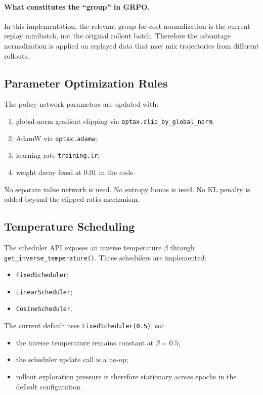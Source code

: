 \documentclass[11pt]{article}
\begin{document}
\paragraph{What constitutes the ``group'' in GRPO.}
In this implementation, the relevant group for cost normalization is the current replay minibatch, not the original rollout batch. Therefore the advantage normalization is applied on replayed data that may mix trajectories from different rollouts.

\subsection{Parameter Optimization Rules}

The policy-network parameters are updated with:
\begin{enumerate}[leftmargin=*]
\item global-norm gradient clipping via \texttt{optax.clip\_by\_global\_norm};
\item AdamW via \texttt{optax.adamw};
\item learning rate \texttt{training.lr};
\item weight decay fixed at $0.01$ in the code.
\end{enumerate}

No separate value network is used.
No entropy bonus is used.
No KL penalty is added beyond the clipped-ratio mechanism.

\subsection{Temperature Scheduling}

The scheduler API exposes an inverse temperature $\beta$ through \texttt{get\_inverse\_temperature()}.
Three schedulers are implemented:
\begin{itemize}[leftmargin=*]
\item \texttt{FixedScheduler};
\item \texttt{LinearScheduler};
\item \texttt{CosineScheduler}.
\end{itemize}

The current default uses \texttt{FixedScheduler(0.5)}, so:
\begin{itemize}[leftmargin=*]
\item the inverse temperature remains constant at $\beta = 0.5$;
\item the scheduler update call is a no-op;
\item rollout exploration pressure is therefore stationary across epochs in the default configuration.
\end{itemize}
\end{document}
